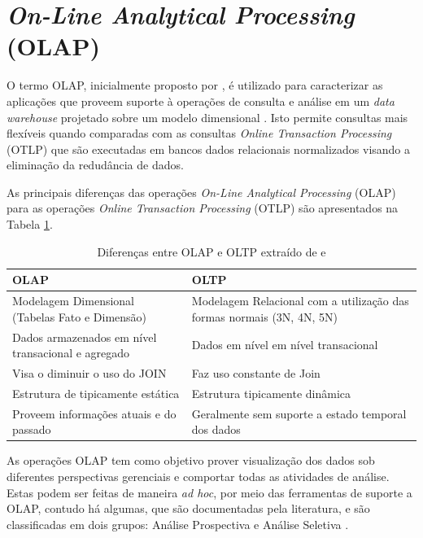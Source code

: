 \section{\textit{On-Line Analytical Processing} (OLAP)}

O termo OLAP, inicialmente proposto por , é utilizado para caracterizar as aplicações que proveem suporte à operações de consulta e análise em um \textit{data warehouse} projetado sobre um modelo dimensional \cite{Kimball2002}. Isto permite consultas mais flexíveis quando comparadas com as consultas \textit{Online Transaction Processing} (OTLP) que são executadas em bancos dados relacionais normalizados  visando a eliminação da redudância de dados.

As principais diferenças das operações \textit{On-Line Analytical Processing} (OLAP) para as operações 
\textit{Online Transaction Processing} (OTLP) são apresentados na Tabela 
\ref{olapxoltp}.

	\begin{table}[!ht]
	\begin{center}
	 \begin{tabular}{|p{5cm}|p{5cm}|}
		\hline
		OLAP & OLTP \\ \hline
		Modelagem Dimensional (Tabelas Fato e Dimensão) & Modelagem Relacional com a utilização das formas normais (3N, 4N, 5N) \\ \hline
		Dados armazenados em nível transacional e agregado    & Dados em nível em nível transacional        \\ \hline
		Visa o diminuir o uso do JOIN & Faz uso constante de Join   \\ \hline
		Estrutura de tipicamente estática   & Estrutura tipicamente dinâmica      \\ \hline
		Proveem informações atuais e do passado & Geralmente sem suporte a estado temporal dos dados
		      \\ \hline
		\end{tabular}
		\caption{Diferenças entre OLAP e OLTP extraído de  e }
		\label{olapxoltp}
		\end{center}
		\end{table}

As operações OLAP tem como objetivo prover visualização dos dados sob diferentes perspectivas gerenciais e comportar todas as atividades de análise. Estas podem ser feitas de maneira \textit{ad hoc}, por meio das ferramentas de suporte a OLAP, contudo há algumas, que são documentadas pela literatura, e são classificadas em dois grupos: Análise Prospectiva e Análise Seletiva .

